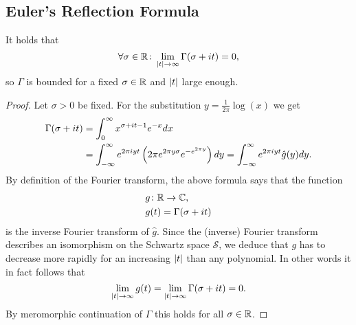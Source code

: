 \subsection{Euler's Reflection Formula}


\begin{lemma}
	It holds that
\begin{equation*}
	\forall \sigma \in \mathbb{R} \colon \lim\limits_{\left|t\right| \to \infty} \Gamma(\sigma + i t) = 0,
\end{equation*}
	so $\Gamma$ is bounded for a fixed $\sigma \in \mathbb{R}$ and $\left|t\right|$ large enough.
\end{lemma}
\begin{proof}
	Let $\sigma >0$ be fixed. For the substitution $y = \frac{1}{2 \pi} \log(x)$ we get
\begin{equation*}
\begin{aligned}	
	\Gamma(\sigma + i t)
	&= \int_0^\infty x^{\sigma + i t - 1} e^{-x} dx \\
	&= \int_{-\infty}^\infty e^{2 \pi i y t} \left(2 \pi e^{2 \pi y \sigma} e^{-e^{2 \pi y}}\right) dy = \int_{-\infty}^\infty e^{2 \pi i y t} \hat{g}(y) dy.
\end{aligned}
\end{equation*}
	By definition of the Fourier transform, the above formula says that the function
\begin{equation*}
\begin{aligned}
	&g\colon \mathbb{R} \to \mathbb{C}, \\
	&g(t) = \Gamma(\sigma + i t)
\end{aligned}
\end{equation*}
	is the inverse Fourier transform of $\hat{g}$. Since the (inverse) Fourier transform describes an isomorphism on the Schwartz space $\mathcal{S}$, we deduce that $g$ has to decrease more rapidly for an increasing $\left|t\right|$ than any polynomial. In other words it in fact follows that
\begin{equation*}
	\lim\limits_{\left|t\right| \to \infty} g(t) = \lim\limits_{\left|t\right| \to \infty} \Gamma(\sigma + i t) = 0.
\end{equation*}
	By meromorphic continuation of $\Gamma$ this holds for all $\sigma \in \mathbb{R}$.
\end{proof}


